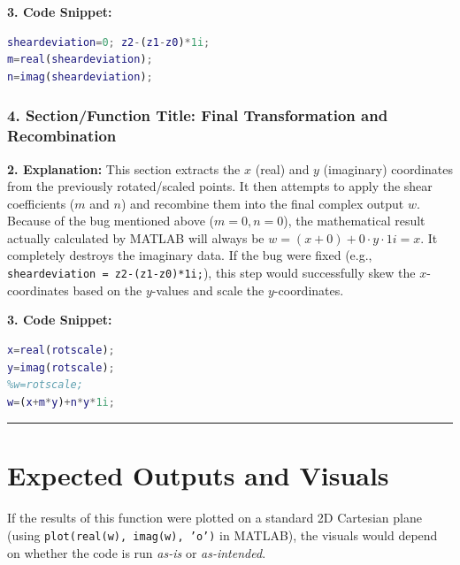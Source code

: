 \textbf{3. Code Snippet:}
\begin{lstlisting}[language=Matlab]
sheardeviation=0; z2-(z1-z0)*1i;
m=real(sheardeviation);
n=imag(sheardeviation);
\end{lstlisting}


\subsubsection*{4. Section/Function Title: Final Transformation and Recombination}
\textbf{2. Explanation:} This section extracts the $x$ (real) and $y$ (imaginary) coordinates from the previously rotated/scaled points. It then attempts to apply the shear coefficients ($m$ and $n$) and recombine them into the final complex output $w$. 
Because of the bug mentioned above ($m=0, n=0$), the mathematical result actually calculated by MATLAB will always be $w = (x + 0) + 0 \cdot y \cdot 1i = x$. It completely destroys the imaginary data. If the bug were fixed (e.g., \texttt{sheardeviation = z2-(z1-z0)*1i;}), this step would successfully skew the $x$-coordinates based on the $y$-values and scale the $y$-coordinates.

\textbf{3. Code Snippet:}
\begin{lstlisting}[language=Matlab]
x=real(rotscale);
y=imag(rotscale);
%w=rotscale;
w=(x+m*y)+n*y*1i;
\end{lstlisting}

\vspace{0.5cm}
\hrule
\vspace{0.5cm}

\section*{Expected Outputs and Visuals}

If the results of this function were plotted on a standard 2D Cartesian plane (using \texttt{plot(real(w), imag(w), 'o')} in MATLAB), the visuals would depend on whether the code is run \textit{as-is} or \textit{as-intended}.

